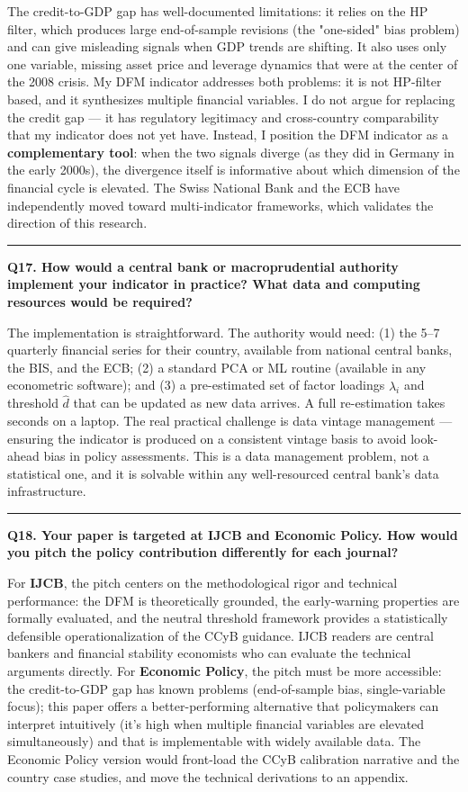 \documentclass[11pt,a4paper]{article}
\begin{document}
The credit-to-GDP gap has well-documented limitations: it relies on the HP filter, which produces large end-of-sample revisions (the "one-sided" bias problem) and can give misleading signals when GDP trends are shifting. It also uses only one variable, missing asset price and leverage dynamics that were at the center of the 2008 crisis. My DFM indicator addresses both problems: it is not HP-filter based, and it synthesizes multiple financial variables. I do not argue for replacing the credit gap — it has regulatory legitimacy and cross-country comparability that my indicator does not yet have. Instead, I position the DFM indicator as a \textbf{complementary tool}: when the two signals diverge (as they did in Germany in the early 2000s), the divergence itself is informative about which dimension of the financial cycle is elevated. The Swiss National Bank and the ECB have independently moved toward multi-indicator frameworks, which validates the direction of this research.

\medskip\hrule\medskip

\textbf{Q17. How would a central bank or macroprudential authority implement your indicator in practice? What data and computing resources would be required?}

The implementation is straightforward. The authority would need: (1) the 5–7 quarterly financial series for their country, available from national central banks, the BIS, and the ECB; (2) a standard PCA or ML routine (available in any econometric software); and (3) a pre-estimated set of factor loadings $\hat{\lambda}_i$ and threshold $\hat{d}$ that can be updated as new data arrives. A full re-estimation takes seconds on a laptop. The real practical challenge is data vintage management — ensuring the indicator is produced on a consistent vintage basis to avoid look-ahead bias in policy assessments. This is a data management problem, not a statistical one, and it is solvable within any well-resourced central bank's data infrastructure.

\medskip\hrule\medskip

\textbf{Q18. Your paper is targeted at IJCB and Economic Policy. How would you pitch the policy contribution differently for each journal?}

For \textbf{IJCB}, the pitch centers on the methodological rigor and technical performance: the DFM is theoretically grounded, the early-warning properties are formally evaluated, and the neutral threshold framework provides a statistically defensible operationalization of the CCyB guidance. IJCB readers are central bankers and financial stability economists who can evaluate the technical arguments directly. For \textbf{Economic Policy}, the pitch must be more accessible: the credit-to-GDP gap has known problems (end-of-sample bias, single-variable focus); this paper offers a better-performing alternative that policymakers can interpret intuitively (it's high when multiple financial variables are elevated simultaneously) and that is implementable with widely available data. The Economic Policy version would front-load the CCyB calibration narrative and the country case studies, and move the technical derivations to an appendix.
\end{document}
